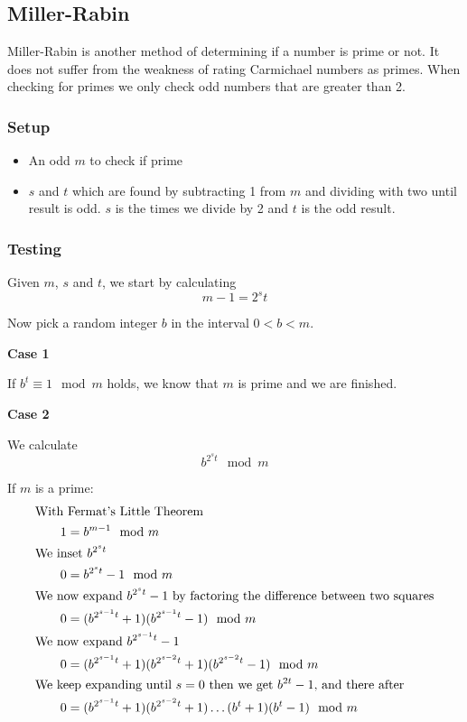 \subsection{Miller-Rabin}
Miller-Rabin is another method of determining if a number is prime or
not. It does not suffer from the weakness of rating Carmichael numbers
as primes. When checking for primes we only check odd numbers that are
greater than 2.

\subsubsection*{Setup}
\begin{itemize}
\item An odd $m$ to check if prime
\item $s$ and $t$ which are found by subtracting 1 from $m$ and
  dividing with two until result is odd. $s$ is the times we divide by
  2 and $t$ is the odd result.
\end{itemize}

\subsubsection*{Testing}
Given $m$, $s$ and $t$, we start by calculating
\[ m - 1 =2^s t \]

Now pick a random integer $b$ in the interval $0<b<m$.

\textbf{Case 1}

If $b^t \equiv 1 \mod m$ holds, we know that $m$ is prime and we are finished.

\textbf{Case 2}

We calculate
\[ b^{2^{s}t} \mod m \]

If $m$ is a prime:
\begin{align}\label{eq:miller-fac}
  &\text{With Fermat's Little Theorem} \notag\\
  &\qquad 1 = b^{m-1} \mod m \notag\\
  &\text{We inset } b^{2^st} \notag\\
  &\qquad 0 = b^{2^st}-1\mod m \notag\\
  &\text{We now expand } b^{2^{s}t} - 1 \text{ by factoring the difference between two squares} \notag\\
  &\qquad 0 = (b^{2^{s-1}t} + 1)(b^{2^{s-1}t} - 1) \mod m \notag\\
  &\text{We now expand } b^{2^{s-1}t}-1 \notag\\
  &\qquad 0 = (b^{2^{s-1}t} + 1)(b^{2^{s-2}t} + 1)(b^{2^{s-2}t} - 1) \mod m \notag\\
  &\text{We keep expanding until $s=0$ then we get $b^{2t} - 1$, and there after} \notag\\
  &\qquad 0 = (b^{2^{s-1}t} + 1)(b^{2^{s-2}t} + 1) \ldots (b^{t} + 1)(b^{t} - 1) \mod m
\end{align}

